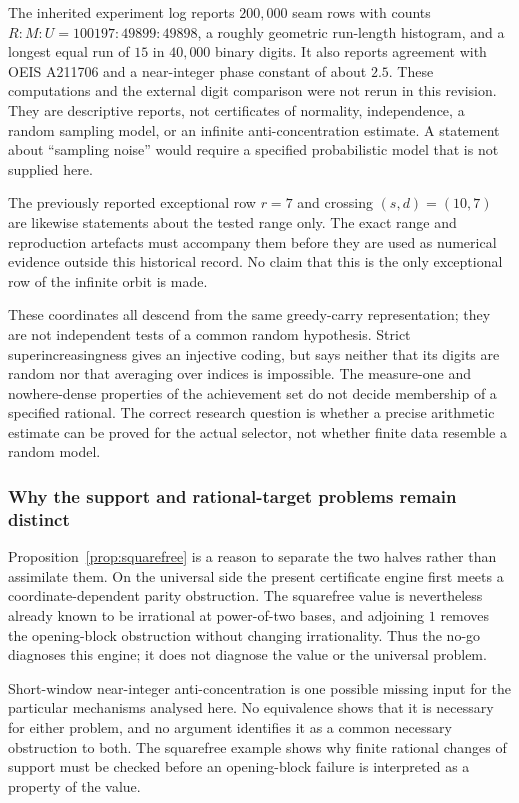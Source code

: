 The inherited experiment log reports $200{,}000$ seam rows with counts
$R:M:U=100197:49899:49898$, a roughly geometric run-length histogram, and a
longest equal run of $15$ in $40{,}000$ binary digits.  It also reports
agreement with OEIS A211706 and a near-integer phase constant of about
$2.5$.  These computations and the external digit comparison were not rerun
in this revision.  They are descriptive reports, not certificates of
normality, independence, a random sampling model, or an infinite
anti-concentration estimate.  A statement about ``sampling noise'' would
require a specified probabilistic model that is not supplied here.

The previously reported exceptional row $r=7$ and crossing $(s,d)=(10,7)$
are likewise statements about the tested range only.  The exact range and
reproduction artefacts must accompany them before they are used as
numerical evidence outside this historical record.  No claim that this is
the only exceptional row of the infinite orbit is made.

These coordinates all descend from the same greedy-carry representation;
they are not independent tests of a common random hypothesis.  Strict
superincreasingness gives an injective coding, but says neither that its
digits are random nor that averaging over indices is impossible.  The
measure-one and nowhere-dense properties of the achievement set do not
decide membership of a specified rational.  The correct research question
is whether a precise arithmetic estimate can be proved for the actual
selector, not whether finite data resemble a random model.

\subsubsection*{Why the support and rational-target problems remain distinct}

Proposition~\ref{prop:squarefree} is a reason to separate the two halves
rather than assimilate them.  On the universal side the present
certificate engine first meets a coordinate-dependent parity obstruction.
The squarefree value is nevertheless already known to be irrational at
power-of-two bases, and adjoining $1$ removes the opening-block obstruction
without changing irrationality.  Thus the no-go diagnoses this engine; it
does not diagnose the value or the universal problem.

Short-window near-integer anti-concentration is one possible missing
input for the particular mechanisms analysed here.  No equivalence shows
that it is necessary for either problem, and no argument identifies it as
a common necessary obstruction to both.  The squarefree example shows why
finite rational changes of support must be checked before an opening-block
failure is interpreted as a property of the value.

